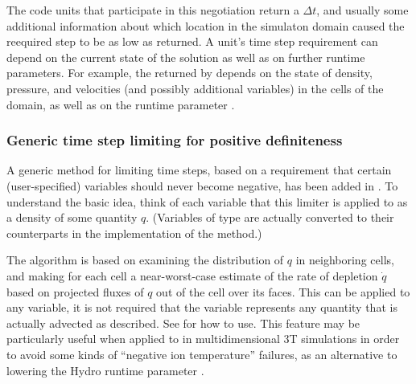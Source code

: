 The code units that participate in this negotiation return a $\Delta t$,
and usually some additional information about which location in the
simulaton domain caused the reequired step to be as low as returned.
A unit's time step requirement can depend on the current state of the
solution as well as on further runtime parameters.
For example, the  returned by 
depends on the state of density, pressure, and velocities (and possibly
additional variables) in the cells of the domain, as well as on
the runtime parameter .


\subsubsection{Generic time step limiting for positive definiteness}
\label{Sec:dr_posdef}
A generic method for limiting time steps, based on a requirement that certain (user-specified)
variables should never become negative, has been added in \flashx.
To understand the basic idea, think of each variable that this limiter is applied
to as a density of some quantity $q$. (Variables of  type are actually converted to
their  counterparts in the implementation of the method.)

The algorithm is based on examining the distribution of $q$ in neighboring cells,
and making for each cell a near-worst-case estimate of the rate of depletion $\dot q$ 
based on projected fluxes of $q$ out of the cell over its faces.
This can be applied to any variable, it is not required that the variable
represents any quantity that is actually advected as described.
See  for how to use.
This feature may be particularly useful when applied to  in
multidimensional 3T simulations in order to avoid some kinds of ``negative ion temperature''
failures, as an alternative to lowering the \unit{Hydro} runtime parameter .


